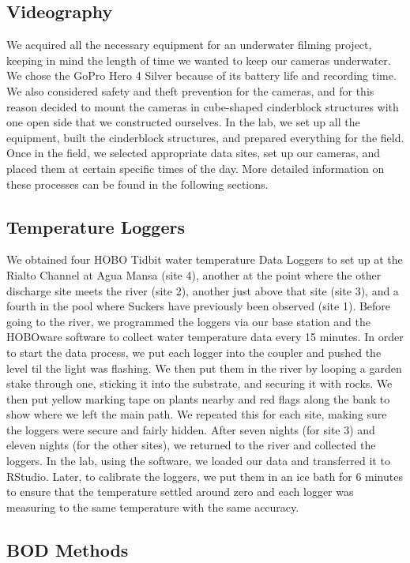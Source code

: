 \documentclass{article}
\begin{document}
\subsection{Videography}

We acquired all the necessary equipment for an underwater filming project, keeping in mind the length of time we wanted to keep our cameras underwater. We chose the GoPro Hero 4 Silver because of its battery life and recording time. We also considered safety and theft prevention for the cameras, and for this reason decided to mount the cameras in cube-shaped cinderblock structures with one open side that we constructed ourselves. In the lab, we set up all the equipment, built the cinderblock structures, and prepared everything for the field. Once in the field, we selected appropriate data sites, set up our cameras, and placed them at certain specific times of the day. More detailed information on these processes can be found in the following sections.

\subsection{Temperature Loggers}
We obtained four HOBO Tidbit water temperature Data Loggers to set up at the Rialto Channel at Agua Mansa (site 4), another at the point where the other discharge site meets the river (site 2), another just above that site (site 3), and a fourth in the pool where Suckers have previously been observed (site 1). Before going to the river, we programmed the loggers via our base station and the HOBOware software to collect water temperature data every 15 minutes. In order to start the data process, we put each logger into the coupler and pushed the level til the light was flashing. We then put them in the river by looping a garden stake through one, sticking it into the substrate, and securing it with rocks. We then put yellow marking tape on plants nearby and red flags along the bank to show where we left the main path. We repeated this for each site, making sure the loggers were secure and fairly hidden. After seven nights (for site 3) and eleven nights (for the other sites), we returned to the river and collected the loggers. In the lab, using the software, we loaded our data and transferred it to RStudio. Later, to calibrate the loggers, we put them in an ice bath for 6 minutes to ensure that the temperature settled around zero and each logger was measuring to the same temperature with the same accuracy.

\subsection{BOD Methods}
\end{document}
